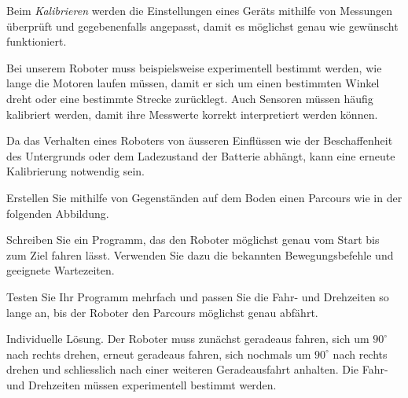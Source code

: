 \begin{myremark}

    Beim \emph{Kalibrieren} werden die Einstellungen eines
    Geräts mithilfe von Messungen überprüft und gegebenenfalls
    angepasst, damit es möglichst genau wie gewünscht
    funktioniert.

    Bei unserem Roboter muss beispielsweise experimentell
    bestimmt werden, wie lange die Motoren laufen müssen,
    damit er sich um einen bestimmten Winkel dreht oder
    eine bestimmte Strecke zurücklegt. Auch Sensoren müssen
    häufig kalibriert werden, damit ihre Messwerte korrekt
    interpretiert werden können.

    Da das Verhalten eines Roboters von äusseren Einflüssen
    wie der Beschaffenheit des Untergrunds oder dem
    Ladezustand der Batterie abhängt, kann eine erneute
    Kalibrierung notwendig sein.
\end{myremark}


\begin{myexercise}

    Erstellen Sie mithilfe von Gegenständen auf dem Boden
    einen Parcours wie in der folgenden Abbildung.

    \begin{center}
    \end{center}

    Schreiben Sie ein Programm, das den Roboter möglichst
    genau vom Start bis zum Ziel fahren lässt.
    Verwenden Sie dazu die bekannten Bewegungsbefehle
    und geeignete Wartezeiten.

    Testen Sie Ihr Programm mehrfach und passen Sie
    die Fahr- und Drehzeiten so lange an, bis der
    Roboter den Parcours möglichst genau abfährt.

    \begin{myanswer}
        Individuelle Lösung. Der Roboter muss zunächst
        geradeaus fahren, sich um \(90^\circ\) nach rechts
        drehen, erneut geradeaus fahren, sich nochmals
        um \(90^\circ\) nach rechts drehen und schliesslich
        nach einer weiteren Geradeausfahrt anhalten.
        Die Fahr- und Drehzeiten müssen experimentell
        bestimmt werden.
    \end{myanswer}
\end{myexercise}


